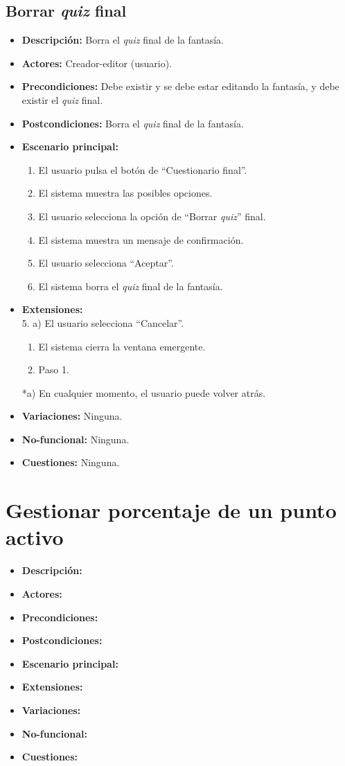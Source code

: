 \subsection{Borrar \textit{quiz} final}
\begin{itemize}
	\item \textbf{Descripción:} Borra el \textit{quiz} final de la fantasía.
	\item \textbf{Actores:} Creador-editor (usuario).
	\item \textbf{Precondiciones:} Debe existir y se debe estar editando la fantasía, y debe existir el \textit{quiz} final.
	\item \textbf{Postcondiciones:} Borra el \textit{quiz} final de la fantasía.
	\item \textbf{Escenario principal:}
	\begin{enumerate}
		\item El usuario pulsa el botón de ``Cuestionario final''.
		\item El sistema muestra las posibles opciones.
		\item El usuario selecciona la opción de ``Borrar \textit{quiz}'' final.
		\item El sistema muestra un mensaje de confirmación.
		\item El usuario selecciona ``Aceptar''.
		\item El sistema borra el \textit{quiz} final de la fantasía.
	\end{enumerate}
	\item \textbf{Extensiones:} \\ 5. a) El usuario selecciona ``Cancelar''.
	\begin{enumerate}
		\item El sistema cierra la ventana emergente.
		\item Paso 1.
	\end{enumerate}
	*a) En cualquier momento, el usuario puede volver atrás.
	\item \textbf{Variaciones:} Ninguna.
	\item \textbf{No-funcional:} Ninguna.
	\item \textbf{Cuestiones:} Ninguna.
\end{itemize}


\section{Gestionar porcentaje de un punto activo}
\begin{itemize}
	\item \textbf{Descripción:}
	\item \textbf{Actores:}
	\item \textbf{Precondiciones:}
	\item \textbf{Postcondiciones:}
	\item \textbf{Escenario principal:}
	\item \textbf{Extensiones:}
	\item \textbf{Variaciones:}
	\item \textbf{No-funcional:}
	\item \textbf{Cuestiones:}
\end{itemize}


